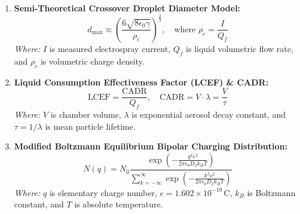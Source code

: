 \documentclass[11pt,a4paper]{article}
\begin{document}
\begin{enumerate}[label=\textbf{Equation \arabic* ---}, itemsep=1.5em, leftmargin=*]
  \item \textbf{Semi-Theoretical Crossover Droplet Diameter Model:}
  \begin{equation}
  d_{\text{max}} \approx \left( \frac{6 \sqrt{8 \epsilon_0 \gamma}}{\rho_c} \right)^{\frac{2}{3}}, \quad \text{where } \rho_c = \frac{I}{Q_f}
  \end{equation}
  \textit{Where:} $I$ is measured electrospray current, $Q_f$ is liquid volumetric flow rate, and $\rho_c$ is volumetric charge density.

  \item \textbf{Liquid Consumption Effectiveness Factor (LCEF) \& CADR:}
  \begin{equation}
  \text{LCEF} = \frac{\text{CADR}}{Q_f}, \quad \text{CADR} = V \cdot \lambda = \frac{V}{\tau}
  \end{equation}
  \textit{Where:} $V$ is chamber volume, $\lambda$ is exponential aerosol decay constant, and $\tau = 1/\lambda$ is mean particle lifetime.

  \item \textbf{Modified Boltzmann Equilibrium Bipolar Charging Distribution:}
  \begin{equation}
  N(q) = N_0 \frac{\exp\left( -\frac{q^2 e^2}{2 \pi \epsilon_0 D_2 k_B T} \right)}{\sum_{k=-\infty}^{\infty} \exp\left( -\frac{k^2 e^2}{2 \pi \epsilon_0 D_2 k_B T} \right)}
  \end{equation}
  \textit{Where:} $q$ is elementary charge number, $e = 1.602 \times 10^{-19} \, \text{C}$, $k_B$ is Boltzmann constant, and $T$ is absolute temperature.

\end{enumerate}
\end{document}
